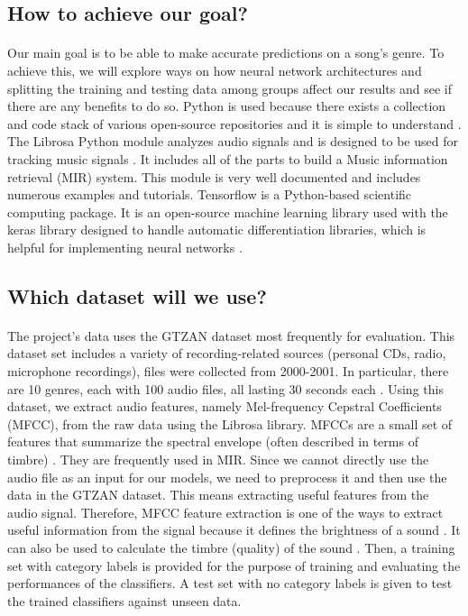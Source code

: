     \subsection{How to achieve our goal?}
    \paragraph{}
    Our main goal is to be able to make accurate predictions on a song’s genre. To achieve this, we will explore ways on how neural network architectures and splitting the training and testing data among groups affect our results and see if there are any benefits to do so. Python is used because there exists a collection and code stack of various open-source repositories and it is simple to understand \cite{python}. The Librosa Python module analyzes audio signals and is designed to be used for tracking music signals \cite{librosa}. It includes all of the parts to build a Music information retrieval (MIR) system. This module is very well documented and includes numerous examples and tutorials. Tensorflow is a Python-based scientific computing package. It is an open-source machine learning library used with the keras library designed to handle automatic differentiation libraries, which is helpful for implementing neural networks \cite{tensorflow}.
    
    \subsection{Which dataset will we use?}
    \paragraph{}
    The project’s data uses the GTZAN dataset \cite{kaggle} most frequently for evaluation. This dataset set includes a variety of recording-related sources (personal CDs, radio, microphone recordings), files were collected from 2000-2001. In particular, there are 10 genres, each with 100 audio files, all lasting 30 seconds each \cite{kaggle}. Using this dataset, we extract audio features, namely Mel-frequency Cepstral Coefficients (MFCC), from the raw data using the Librosa library. MFCCs are a small set of features that summarize the spectral envelope (often described in terms of timbre) \cite{haggblade_hong_kao}. They are frequently used in MIR. Since we cannot directly use the audio file as an input for our models, we need to preprocess it and then use the data in the GTZAN dataset. This means extracting useful features from the audio signal. Therefore, MFCC feature extraction is one of the ways to extract useful information from the signal because it defines the brightness of a sound \cite{haggblade_hong_kao}. It can also be used to calculate the timbre (quality) of the sound \cite{ceylan_hardala_kara_hardalac}. Then, a training set with category labels is provided for the purpose of training and evaluating the performances of the classifiers. A test set with no category labels is given to test the trained classifiers against unseen data.
 
